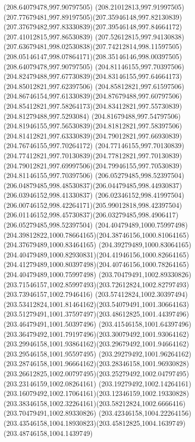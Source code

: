 {{\moveto(208.64079478,997.90797505)
\curveto(208.21012813,997.91997505)(207.77679481,997.89197505)(207.35946148,997.82130839)
\curveto(207.37679482,997.83330839)(207.39546148,997.84664172)(207.41012815,997.86530839)
\curveto(207.52612815,997.94130838)(207.63679481,998.02530838)(207.74212814,998.11597505)
\curveto(208.05146147,998.07864171)(208.35146146,998.00397505)(208.64079478,997.90797505)
\moveto(204.81146155,997.70397506)
\curveto(204.82479488,997.67730839)(204.83146155,997.64664173)(204.85012821,997.62397506)
\curveto(204.85812821,997.61597506)(204.86746154,997.61330839)(204.87679488,997.60797506)
\curveto(204.85412821,997.58264173)(204.83412821,997.55730839)(204.81279488,997.5293084)
\curveto(204.81679488,997.54797506)(204.81946155,997.56530839)(204.81812821,997.58397506)
\curveto(204.81412821,997.63330839)(204.79012821,997.66930839)(204.76746155,997.70264172)
\curveto(204.77146155,997.70130839)(204.77412821,997.70130839)(204.77812821,997.70130839)
\curveto(204.79012821,997.69997506)(204.79946155,997.70530839)(204.81146155,997.70397506)
\moveto(206.05279485,998.52397504)
\curveto(206.04879485,998.48530837)(206.04479485,998.44930837)(206.03946152,998.41330837)
\curveto(206.02346152,998.41997504)(206.00746152,998.42264171)(205.99012818,998.42397504)
\curveto(206.01146152,998.45730837)(206.03279485,998.4906417)(206.05279485,998.52397504)
\moveto(204.40479489,1000.75997498)
\curveto(204.39812822,1000.78664165)(204.38746156,1000.81064165)(204.37679489,1000.83464165)
\curveto(204.39279489,1000.83064165)(204.40479489,1000.82930831)(204.41946156,1000.82664165)
\curveto(204.41279489,1000.80397498)(204.40746156,1000.78264165)(204.40479489,1000.75997498)
\moveto(203.70479491,1002.89330826)
\curveto(203.71546157,1002.85997493)(203.72612824,1002.82797493)(203.73946157,1002.7946416)
\curveto(203.57412824,1002.30397494)(203.53412824,1001.81464162)(203.54079491,1001.30664163)
\curveto(203.51279491,1001.37597497)(203.48612825,1001.44397496)(203.46479491,1001.50397496)
\curveto(203.41546158,1001.64397496)(203.36479492,1001.79197496)(203.30079492,1001.93064162)
\curveto(203.29946158,1001.93864162)(203.29679492,1001.94664162)(203.29546158,1001.95597495)
\curveto(203.29279492,1001.96264162)(203.28746158,1001.96664162)(203.28346158,1001.96930828)
\curveto(203.26612825,1002.00797495)(203.25279492,1002.04797495)(203.23146159,1002.08264161)
\curveto(203.19279492,1002.14264161)(203.16079492,1002.17064161)(203.12346159,1002.19330828)
\curveto(203.38346158,1002.32264161)(203.58212824,1002.6666416)(203.70479491,1002.89330826)
\moveto(203.42346158,1004.22264156)
\curveto(203.43546158,1004.18930823)(203.45812825,1004.1639749)(203.48746158,1004.1439749)
}}
